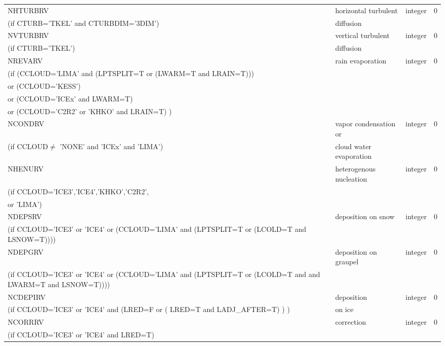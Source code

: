 \begin{longtable} {|p{}|p{}|>{\centering}p{}|p{}<{\centering}|}
NHTURBRV & horizontal turbulent & integer  &  0 \index{NHTURBRV!\innam{NAM\_BU\_RRV}}\\ \nopagebreak
(if CTURB='TKEL' and CTURBDIM='3DIM') &diffusion &   &  \\\hline
NVTURBRV & vertical turbulent& integer  &  0 \index{NVTURBRV!\innam{NAM\_BU\_RRV}}\\ \nopagebreak
(if CTURB='TKEL') &diffusion &   &  \\\hline
NREVARV & rain evaporation & integer  &  0 \index{NREVARV!\innam{NAM\_BU\_RRV}}\\ \nopagebreak
(if (CCLOUD='LIMA' and (LPTSPLIT=T or (LWARM=T and LRAIN=T))) & & & \\ \nopagebreak
 or (CCLOUD='KESS') & & & \\ \nopagebreak
 or (CCLOUD='ICEx' and LWARM=T) & & & \\ \nopagebreak
 or (CCLOUD='C2R2' or 'KHKO' and LRAIN=T) ) & & & \\ \hline
NCONDRV   & vapor condensation or & integer  &  0 \index{NCONDRV!\innam{NAM\_BU\_RRV}}\\ \nopagebreak
(if CCLOUD$ \neq$ 'NONE' and 'ICEx' and 'LIMA') & cloud water evaporation& &   \\\hline
NHENURV   & heterogenous nucleation & integer  &  0 \index{NHENURV!\innam{NAM\_BU\_RRV}}\\ \nopagebreak
(if CCLOUD='ICE3','ICE4','KHKO','C2R2', & &   &  \\ \nopagebreak
or 'LIMA') & &   &  \\\hline
NDEPSRV   & deposition on snow & integer  &  0 \index{NDEPSRV!\innam{NAM\_BU\_RRV}}\\ \nopagebreak
(if CCLOUD='ICE3' or 'ICE4' or (CCLOUD='LIMA' and (LPTSPLIT=T or (LCOLD=T and LSNOW=T)))) & &   &  \\\hline
NDEPGRV   & deposition on graupel & integer  &  0 \index{NDEPGRV!\innam{NAM\_BU\_RRV}}\\ \nopagebreak
(if CCLOUD='ICE3' or 'ICE4' or (CCLOUD='LIMA' and (LPTSPLIT=T or (LCOLD=T and and LWARM=T and LSNOW=T)))) & &   &  \\\hline
NCDEPIRV   & deposition & integer  &  0 \index{NCDEPIRV!\innam{NAM\_BU\_RRV}}\\ \nopagebreak
(if CCLOUD='ICE3' or 'ICE4' and (LRED=F or ( LRED=T and LADJ\_AFTER=T) )  ) &on ice &   &  \\\hline
NCORRRV  & correction          & integer  &  0 \index{NCORRRV!\innam{NAM\_BU\_RRV}}\\ \nopagebreak
(if CCLOUD='ICE3' or 'ICE4' and LRED=T) & &   &  \\\hline

\end{longtable}
